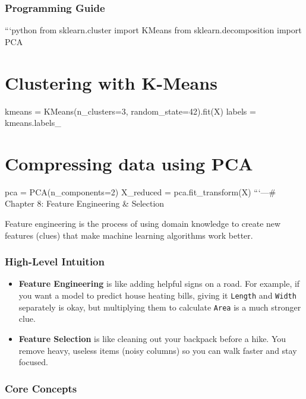 \subsubsection{Programming Guide}\label{programming-guide-6}

```python from sklearn.cluster import KMeans from sklearn.decomposition
import PCA

\section{Clustering with K-Means}\label{clustering-with-k-means}

kmeans = KMeans(n\_clusters=3, random\_state=42).fit(X) labels =
kmeans.labels\_

\section{Compressing data using PCA}\label{compressing-data-using-pca}

pca = PCA(n\_components=2) X\_reduced = pca.fit\_transform(X)
```\n\n---\n\n\# Chapter 8: Feature Engineering \& Selection

Feature engineering is the process of using domain knowledge to create
new features (clues) that make machine learning algorithms work better.

\subsubsection{High-Level Intuition}\label{high-level-intuition-7}

\begin{itemize}
\tightlist
\item
  \textbf{Feature Engineering} is like adding helpful signs on a road.
  For example, if you want a model to predict house heating bills,
  giving it \texttt{Length} and \texttt{Width} separately is okay, but
  multiplying them to calculate \texttt{Area} is a much stronger clue.
\item
  \textbf{Feature Selection} is like cleaning out your backpack before a
  hike. You remove heavy, useless items (noisy columns) so you can walk
  faster and stay focused.
\end{itemize}

\subsubsection{Core Concepts}\label{core-concepts-3}

